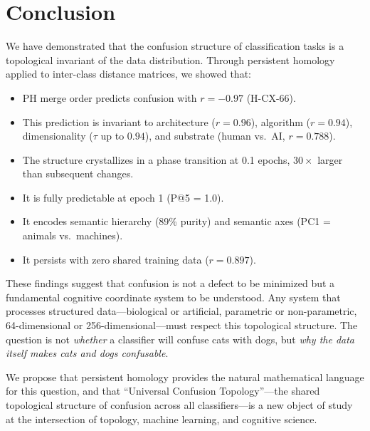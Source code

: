 \documentclass[11pt,a4paper]{article}
\begin{document}
\section{Conclusion}
\label{sec:conclusion}

We have demonstrated that the confusion structure of classification tasks is a topological invariant of the data distribution. Through persistent homology applied to inter-class distance matrices, we showed that:

\begin{itemize}
  \item PH merge order predicts confusion with $r = -0.97$ (H-CX-66).
  \item This prediction is invariant to architecture ($r = 0.96$), algorithm ($r = 0.94$), dimensionality ($\tau$ up to $0.94$), and substrate (human vs.\ AI, $r = 0.788$).
  \item The structure crystallizes in a phase transition at 0.1 epochs, $30\times$ larger than subsequent changes.
  \item It is fully predictable at epoch 1 (P@5 = 1.0).
  \item It encodes semantic hierarchy (89\% purity) and semantic axes (PC1 = animals vs.\ machines).
  \item It persists with zero shared training data ($r = 0.897$).
\end{itemize}

These findings suggest that confusion is not a defect to be minimized but a fundamental cognitive coordinate system to be understood. Any system that processes structured data---biological or artificial, parametric or non-parametric, 64-dimensional or 256-dimensional---must respect this topological structure. The question is not \emph{whether} a classifier will confuse cats with dogs, but \emph{why the data itself makes cats and dogs confusable}.

We propose that persistent homology provides the natural mathematical language for this question, and that ``Universal Confusion Topology''---the shared topological structure of confusion across all classifiers---is a new object of study at the intersection of topology, machine learning, and cognitive science.
\end{document}
